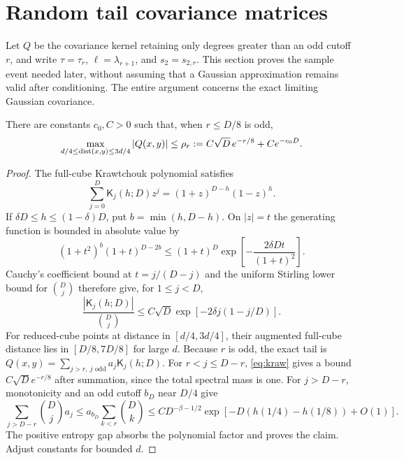 \section{Random tail covariance matrices}
Let $Q$ be the covariance kernel retaining only degrees greater than an
odd cutoff $r$, and write $\tau=\tau_r$, $\ell=\lambda_{r+1}$, and
$s_2=s_{2,r}$. This section proves the sample event needed later, without
assuming that a Gaussian approximation remains valid after conditioning.
The entire argument concerns the exact limiting Gaussian covariance.

\begin{lemma}\label{lem:far}
There are constants $c_0,C>0$ such that, when $r\le D/8$ is odd,
\[
 \max_{d/4\le\operatorname{dist}(x,y)\le3d/4}|Q(x,y)|
 \le\rho_r:=C\sqrt D\,e^{-r/8}+Ce^{-c_0D}.
\]
\end{lemma}
\begin{proof}
The full-cube Krawtchouk polynomial satisfies
\[
 \sum_{j=0}^D\mathsf K_j(h;D)z^j=(1+z)^{D-h}(1-z)^h.
\]
If $\delta D\le h\le(1-\delta)D$, put $b=\min(h,D-h)$.
On $|z|=t$ the generating function is bounded in absolute value by
\[
 (1+t^2)^b(1+t)^{D-2b}
 \le(1+t)^D\exp\!\left[-\frac{2\delta Dt}{(1+t)^2}\right].
\]
Cauchy's coefficient bound at $t=j/(D-j)$ and the uniform Stirling
lower bound for $\binom Dj$ therefore give, for $1\le j<D$,
\begin{equation}\label{eq:kraw}
 \frac{|\mathsf K_j(h;D)|}{\binom Dj}
 \le C\sqrt D\exp[-2\delta j(1-j/D)].
\end{equation}
For reduced-cube points at distance in $[d/4,3d/4]$, their augmented
full-cube distance lies in $[D/8,7D/8]$ for large $d$.
Because $r$ is odd, the exact tail is
$Q(x,y)=\sum_{j>r,\ j\text{ odd}}a_j\mathsf K_j(h;D)$.
For $r<j\le D-r$, \eqref{eq:kraw} gives a bound
$C\sqrt D e^{-r/8}$ after summation, since the total spectral mass
is one. For $j>D-r$, monotonicity and an odd cutoff $b_D$ near $D/4$
give
\[
 \sum_{j>D-r}\binom Dj a_j
 \le a_{b_D}\sum_{k<r}\binom Dk
 \le C D^{-\beta-1/2}
       \exp[-D(h(1/4)-h(1/8))+O(1)].
\]
The positive entropy gap absorbs the polynomial factor and proves the
claim. Adjust constants for bounded $d$.
\end{proof}

